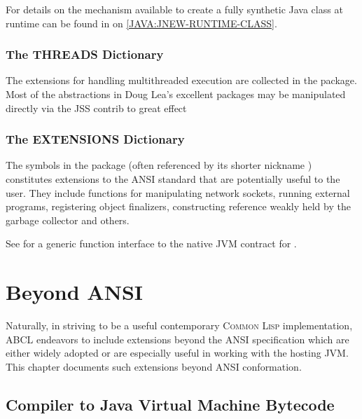 \documentclass[10pt]{book}
\begin{document}
For details on the mechanism available to create a fully synthetic
Java class at runtime can be found in 
on \ref{JAVA:JNEW-RUNTIME-CLASS}.



\subsection{The THREADS Dictionary}

The extensions for handling multithreaded execution are collected in
the  package.  Most of the abstractions in Doug Lea's
excellent  packages may be manipulated
directly via the JSS contrib to great effect \cite{lea-1998}



\subsection{The EXTENSIONS Dictionary}

The symbols in the  package (often referenced by its
shorter nickname ) constitutes extensions to the
\textsc{ANSI} standard that are potentially useful to the user.  They
include functions for manipulating network sockets, running external
programs, registering object finalizers, constructing reference weakly
held by the garbage collector and others.

See \cite{RHODES2007} for a generic function interface to the native
\textsc{JVM} contract for .



\chapter{Beyond ANSI}
\label{chapter:beyond-ansi}

Naturally, in striving to be a useful contemporary \textsc{Common
  Lisp} implementation, \textsc{ABCL} endeavors to include extensions
beyond the ANSI specification which are either widely adopted or are
especially useful in working with the hosting \textsc{JVM}.  This
chapter documents such extensions beyond ANSI conformation.

\section{Compiler to Java Virtual Machine Bytecode}
\end{document}
